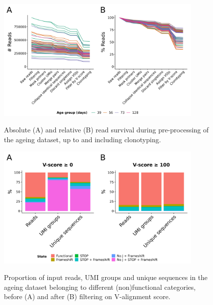 \begin{figure}
\centering
\includegraphics[width = 0.9\textwidth]{_Figures/png/ageing-read-survival-all.png}
\begin{subfigure}{0em}
\label{fig:igseq-ageing-read-survival-all-abs}
\end{subfigure}
\begin{subfigure}{0em}
\label{fig:igseq-ageing-read-survival-all-rel}
\end{subfigure}
\caption{Absolute (A) and relative (B) read survival during pre-processing of the \igseq ageing dataset, up to and including clonotyping.}
\label{fig:igseq-ageing-read-survival-all}
\end{figure}

\begin{figure}
\centering
\includegraphics[width = 0.9\textwidth]{_Figures/png/ageing-functional-prop}
\begin{subfigure}{0em}
\label{fig:igseq-ageing-functional-prop-pre}
\end{subfigure}
\begin{subfigure}{0em}
\label{fig:igseq-ageing-functional-prop-post}
\end{subfigure}
\caption{Proportion of input reads, UMI groups and unique sequences in the \igseq ageing dataset belonging to different (non)functional categories, before (A) and after (B) filtering on V-alignment score.}
\label{fig:igseq-ageing-functional-prop}
\end{figure}


